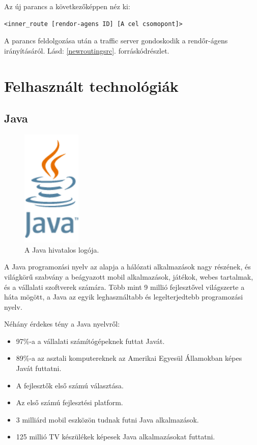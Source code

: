 \documentclass[a4paper,12pt]{report}
\begin{document}
\vspace{2mm}
Az új parancs a következőképpen néz ki:
\begin{lstlisting}
<inner_route [rendor-agens ID] [A cel csomopont]>
\end{lstlisting}

A parancs feldolgozása után a traffic server gondoskodik a rendőr-ágens irányításáról. Lásd: \ref{newroutingsrc}. forráskódrészlet.



\newpage
\chapter{Felhasznált technológiák}
\label{technologies}

\section{Java}
\label{java}

\begin{figure}[ht]
\centerline{
\includegraphics[width=1.1in]{img/javalogo}}
\caption{A Java hivatalos logója.}
\label{javalogo}
\end{figure}

A Java programozási nyelv az alapja a hálózati alkalmazások nagy részének, és világkörű szabvány a beágyazott mobil alkalmazások, játékok, webes tartalmak, és a vállalati szoftverek számára. Több mint 9 millió fejlesztővel világszerte a háta mögött, a Java az egyik leghasználtabb és legelterjedtebb programozási nyelv. 

\vspace{2mm}
Néhány érdekes tény a Java nyelvről:

\begin{itemize}
\item 97\%-a a vállalati számítógépeknek futtat Javát.
\item 89\%-a az asztali komputereknek az Amerikai Egyesül Államokban képes Javát futtatni.
\item A fejlesztők első számú választása.
\item Az első számú fejlesztési platform.
\item 3 milliárd mobil eszközön tudnak futni Java alkalmazások.
\item 125 millió TV készülékek képesek Java alkalmazásokat futtatni.
\end{itemize}
\end{document}
